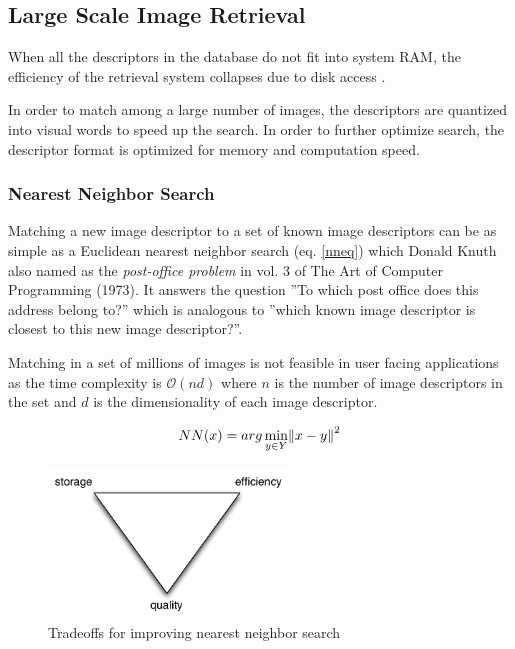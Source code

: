 \documentclass[english,12pt,a4paper,pdftex,elec,utf8]{aaltothesis}
\begin{document}


\subsection{Large Scale Image Retrieval}

When all the descriptors in the database do not fit into system RAM, the efficiency of the retrieval system collapses due to disk access \cite{Philbin2007}.

In order to match among a large number of images, the descriptors are quantized into visual words to speed up the search. In order to further optimize search, the descriptor format is optimized for memory and computation speed. \cite{Jegou2010}

\subsubsection{Nearest Neighbor Search}
Matching a new image descriptor to a set of known image descriptors can be as simple as a Euclidean nearest neighbor search (eq. \ref{nneq}) which Donald Knuth also named as the \emph{post-office problem} in vol. 3 of The Art of Computer Programming (1973). It answers the question ''To which post office does this address belong to?'' which is analogous to ''which known image descriptor is closest to this new image descriptor?''.

Matching in a set of millions of images is not feasible in user facing applications as the time complexity is $\mathcal{O}(nd)$ where $n$ is the number of image descriptors in the set and $d$ is the dimensionality of each image descriptor.


\begin{equation}
\label{nneq}
NN(x) = arg \min_{y\in Y}\norm{x-y}^2
\end{equation}

\begin{figure}[htb]
\begin{center}
\includegraphics[height=4cm]{figures/nntradeoffs}
\end{center}
\caption{Tradeoffs for improving nearest neighbor search}
\label{nntradeoffs}
\end{figure}
\end{document}
